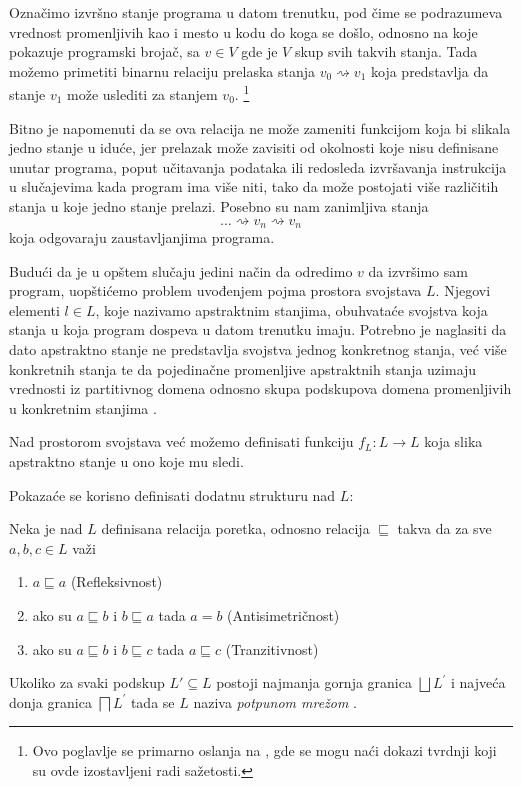 Označimo izvršno stanje programa u datom trenutku, pod čime se podrazumeva vrednost promenljivih kao i mesto u kodu do koga se došlo, odnosno na koje pokazuje programski brojač, sa $v \in V$ gde je $V$ skup svih takvih stanja. Tada možemo primetiti binarnu relaciju prelaska stanja $v_{0} \rightsquigarrow v_{1}$ koja predstavlja da stanje $v_{1}$ može uslediti za stanjem $v_{0}$. \footnote{Ovo poglavlje se primarno oslanja na \cite{salcianu}, gde se mogu naći dokazi tvrdnji koji su ovde izostavljeni radi sažetosti.}

Bitno je napomenuti da se ova relacija ne može zameniti funkcijom koja bi slikala jedno stanje u iduće, jer prelazak može zavisiti od okolnosti koje nisu definisane unutar programa, poput učitavanja podataka ili redosleda izvršavanja instrukcija u slučajevima kada program ima više niti, tako da može postojati više različitih stanja u koje jedno stanje prelazi. Posebno su nam zanimljiva stanja $$... \rightsquigarrow v_{n} \rightsquigarrow v_{n}$$ koja odgovaraju zaustavljanjima programa. 
 
Budući da je u opštem slučaju jedini način da odredimo $v$ da izvršimo sam program, uopštićemo problem uvođenjem pojma prostora svojstava $L$. Njegovi elementi $l \in L$, koje nazivamo apstraktnim stanjima, obuhvataće svojstva koja stanja u koja program dospeva u datom trenutku imaju. Potrebno je naglasiti da dato apstraktno stanje ne predstavlja svojstva jednog konkretnog stanja, već više konkretnih stanja te da pojedinačne promenljive apstraktnih stanja uzimaju vrednosti iz partitivnog domena odnosno skupa podskupova domena promenljivih u konkretnim stanjima \cite{denotationalsemantics}.

Nad prostorom svojstava već možemo definisati funkciju $f_{L}:L\rightarrow L$ koja slika apstraktno stanje u ono koje mu sledi. 

Pokazaće se korisno definisati dodatnu strukturu nad $L$:
\begin{definicija}
Neka je nad $L$ definisana relacija poretka, odnosno relacija $\sqsubseteq$ takva da za sve $a, b, c \in L$ važi
\begin{enumerate}
\item $a \sqsubseteq a$ (Refleksivnost)
\item ako su $a \sqsubseteq b$ i $b \sqsubseteq a$ tada $a = b$ (Antisimetričnost)
\item ako su $a \sqsubseteq b$ i $b \sqsubseteq c$ tada $a \sqsubseteq c$ (Tranzitivnost)
\end{enumerate}
Ukoliko za svaki podskup $L\prime \subseteq L$ postoji najmanja gornja granica $\bigsqcup L^{\prime}$ i najveća donja granica $\bigsqcap L^{\prime}$ tada se $L$ naziva \emph{potpunom mrežom} \cite{algebra}. 
\end{definicija} 

